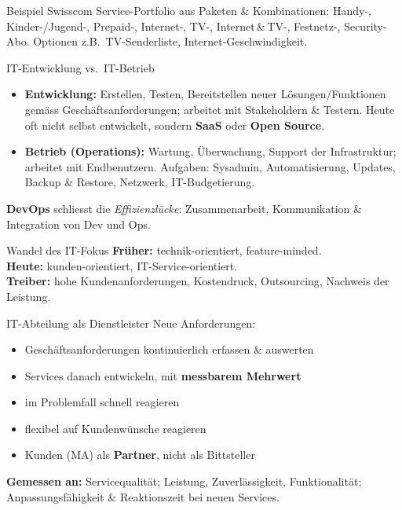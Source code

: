 \documentclass[a4paper, fontsize=7pt]{scrartcl}
\begin{document}
\begin{subbox}{Beispiel Swisscom}
Service-Portfolio aus Paketen \& Kombinationen: Handy-, Kinder-/Jugend-,
Prepaid-, Internet-, TV-, Internet\,\&\,TV-, Festnetz-, Security-Abo.
Optionen z.B.\ TV-Senderliste, Internet-Geschwindigkeit.
\end{subbox}

\begin{mainbox}{IT-Entwicklung vs.\ IT-Betrieb}
\begin{itemize}
    \item \textbf{Entwicklung:} Erstellen, Testen, Bereitstellen neuer
          Lösungen/Funktionen gemäss Geschäftsanforderungen; arbeitet mit
          Stakeholdern \& Testern. Heute oft nicht selbst entwickelt, sondern
          \textbf{SaaS} oder \textbf{Open Source}.
    \item \textbf{Betrieb (Operations):} Wartung, Überwachung, Support der
          Infrastruktur; arbeitet mit Endbenutzern. Aufgaben: Sysadmin,
          Automatisierung, Updates, Backup \& Restore, Netzwerk,
          IT-Budgetierung.
\end{itemize}
\textbf{DevOps} schliesst die \emph{Effizienzlücke}: Zusammenarbeit,
Kommunikation \& Integration von Dev und Ops.
\end{mainbox}

\begin{mainbox}{Wandel des IT-Fokus}
\textbf{Früher:} technik-orientiert, feature-minded.\\
\textbf{Heute:} kunden-orientiert, IT-Service-orientiert.\\
\textbf{Treiber:} hohe Kundenanforderungen, Kostendruck, Outsourcing,
Nachweis der Leistung.
\end{mainbox}

\begin{mainbox}{IT-Abteilung als Dienstleister}
Neue Anforderungen:
\begin{itemize}
    \item Geschäftsanforderungen kontinuierlich erfassen \& auswerten
    \item Services danach entwickeln, mit \textbf{messbarem Mehrwert}
    \item im Problemfall schnell reagieren
    \item flexibel auf Kundenwünsche reagieren
    \item Kunden (MA) als \textbf{Partner}, nicht als Bittsteller
\end{itemize}
\textbf{Gemessen an:} Servicequalität; Leistung, Zuverlässigkeit,
Funktionalität; Anpassungsfähigkeit \& Reaktionszeit bei neuen Services.
\end{mainbox}
\end{document}
